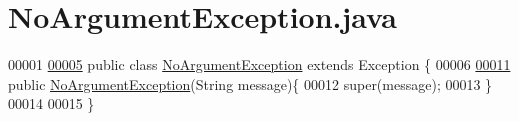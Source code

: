 \hypertarget{NoArgumentException_8java_source}{\section{No\-Argument\-Exception.\-java}
}

\begin{DoxyCode}
00001 
\hypertarget{NoArgumentException_8java_source_l00005}{}\hyperlink{classNoArgumentException}{00005} \textcolor{keyword}{public} \textcolor{keyword}{class }\hyperlink{classNoArgumentException}{NoArgumentException} \textcolor{keyword}{extends} Exception \{
00006 
\hypertarget{NoArgumentException_8java_source_l00011}{}\hyperlink{classNoArgumentException_a9e69615e164747abe00544b065dc738c}{00011}     \textcolor{keyword}{public} \hyperlink{classNoArgumentException_a9e69615e164747abe00544b065dc738c}{NoArgumentException}(String message)\{
00012         super(message);
00013     \}
00014 
00015 \}
\end{DoxyCode}
